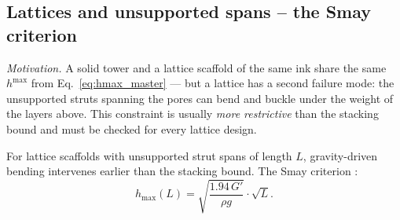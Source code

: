 \documentclass[11pt,a4paper]{article}
\begin{document}
\subsection{Lattices and unsupported spans -- the Smay criterion}

\emph{Motivation.}
A solid tower and a lattice scaffold of the same ink share the same
$h^{\max}$ from Eq.~\eqref{eq:hmax_master} --- but a lattice has a
second failure mode: the unsupported struts spanning the pores can bend
and buckle under the weight of the layers above.  This constraint is
usually \emph{more restrictive} than the stacking bound and must be
checked for every lattice design.

For lattice scaffolds with unsupported strut spans of length $L$,
gravity-driven bending intervenes earlier than the stacking bound.
The Smay criterion \citep{HabibKhoda2018}:
\begin{equation}
h_\mathrm{max}(L) = \sqrt{\frac{1.94\,G'}{\rho g}}\cdot\sqrt{L}.
\label{eq:smay}
\end{equation}
\end{document}
